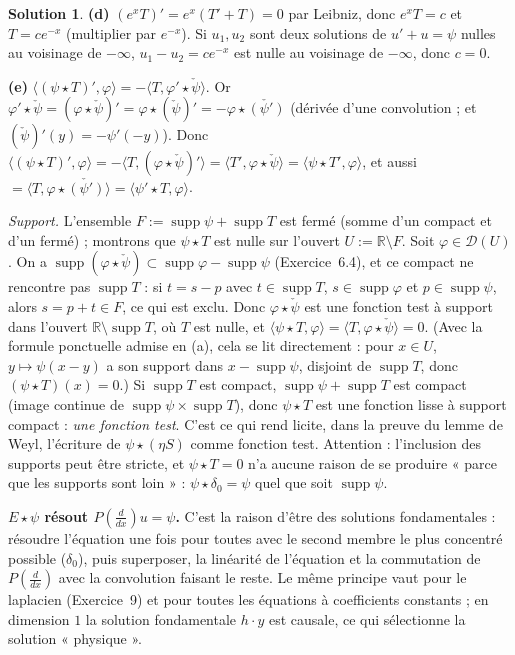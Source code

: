 \documentclass[11pt,a4paper]{article}
\newcommand{\R}{\mathbb{R}}
\DeclareMathOperator{\supp}{supp}
\newcommand{\D}{\mathcal{D}}
\theoremstyle{definition}
\newtheorem*{solution}{Solution}
\begin{document}
\begin{solution}
\medskip
\noindent\textbf{(d)} $(e^xT)'=e^x(T'+T)=0$ par Leibniz, donc $e^xT=c$ et $T=ce^{-x}$ (multiplier par $e^{-x}$). Si $u_1,u_2$ sont deux solutions de $u'+u=\psi$ nulles au voisinage de $-\infty$, $u_1-u_2=ce^{-x}$ est nulle au voisinage de $-\infty$, donc $c=0$.

\medskip
\noindent\textbf{(e)} $\langle(\psi\star T)',\varphi\rangle=-\langle T,\varphi'\star\check\psi\rangle$. Or $\varphi'\star\check\psi=(\varphi\star\check\psi)'=\varphi\star(\check\psi)'=-\varphi\star\check{(\psi')}$ (dérivée d'une convolution ; et $(\check\psi)'(y)=-\psi'(-y)$). Donc $\langle(\psi\star T)',\varphi\rangle=-\langle T,(\varphi\star\check\psi)'\rangle=\langle T',\varphi\star\check\psi\rangle=\langle\psi\star T',\varphi\rangle$, et aussi $=\langle T,\varphi\star\check{(\psi')}\rangle=\langle\psi'\star T,\varphi\rangle$.

\emph{Support.} L'ensemble $F:=\supp\psi+\supp T$ est fermé (somme d'un compact et d'un fermé) ; montrons que $\psi\star T$ est nulle sur l'ouvert $U:=\R\setminus F$. Soit $\varphi\in\D(U)$. On a $\supp(\varphi\star\check\psi)\subset\supp\varphi-\supp\psi$ (Exercice~6.4), et ce compact ne rencontre pas $\supp T$ : si $t=s-p$ avec $t\in\supp T$, $s\in\supp\varphi$ et $p\in\supp\psi$, alors $s=p+t\in F$, ce qui est exclu. Donc $\varphi\star\check\psi$ est une fonction test à support dans l'ouvert $\R\setminus\supp T$, où $T$ est nulle, et $\langle\psi\star T,\varphi\rangle=\langle T,\varphi\star\check\psi\rangle=0$. (Avec la formule ponctuelle admise en (a), cela se lit directement : pour $x\in U$, $y\mapsto\psi(x-y)$ a son support dans $x-\supp\psi$, disjoint de $\supp T$, donc $(\psi\star T)(x)=0$.) Si $\supp T$ est compact, $\supp\psi+\supp T$ est compact (image continue de $\supp\psi\times\supp T$), donc $\psi\star T$ est une fonction lisse à support compact : \emph{une fonction test}. C'est ce qui rend licite, dans la preuve du lemme de Weyl, l'écriture de $\psi\star(\eta S)$ comme fonction test. Attention : l'inclusion des supports peut être stricte, et $\psi\star T=0$ n'a aucune raison de se produire « parce que les supports sont loin » : $\psi\star\delta_0=\psi$ quel que soit $\supp\psi$.
\end{solution}

\begin{pointcle}
\textbf{$E\star\psi$ résout $P(\frac d{dx})u=\psi$.} C'est la raison d'être des solutions fondamentales : résoudre l'équation une fois pour toutes avec le second membre le plus concentré possible ($\delta_0$), puis superposer, la linéarité de l'équation et la commutation de $P(\frac d{dx})$ avec la convolution faisant le reste. Le même principe vaut pour le laplacien (Exercice~9) et pour toutes les équations à coefficients constants ; en dimension $1$ la solution fondamentale $h\cdot y$ est causale, ce qui sélectionne la solution « physique ».
\end{pointcle}
\end{document}
